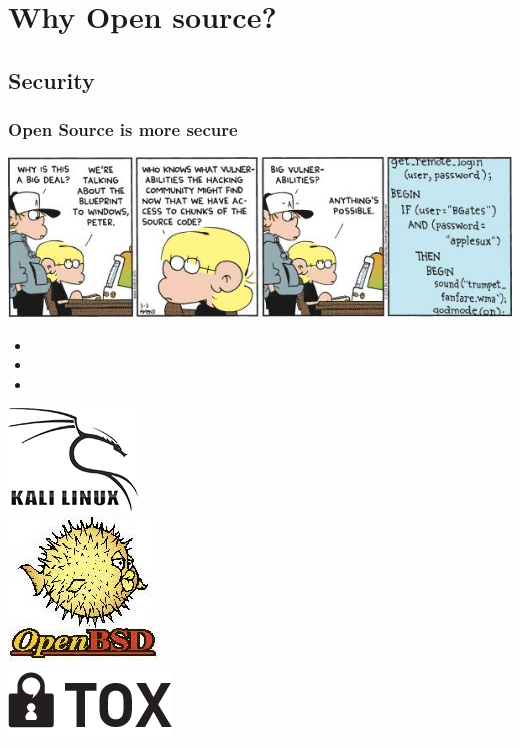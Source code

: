 \documentclass[8pt]{beamer}
\begin{document}
\section{Why Open source?}
\subsection{Security}
\begin{frame}
	\frametitle{Open Source is more secure}
	\includegraphics[width=\textwidth]{foxtrot_strip.jpg}
	\begin{itemize}
			\item {}
			\item {}
			\item {}
	\end{itemize}
\end{frame}

\begin{frame}
	\includegraphics[scale=.8]{kalilinux.png}\\
	\includegraphics[scale=.8]{openbsd.jpg}\centering\\
	\includegraphics[scale=.6]{tox.png}\raggedleft
\end{frame}
\end{document}
